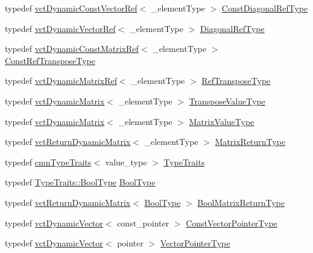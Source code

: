 \begin{DoxyCompactItemize}
\item 
typedef \hyperlink{classvct_dynamic_const_vector_ref}{vct\+Dynamic\+Const\+Vector\+Ref}$<$ \+\_\+element\+Type $>$ \hyperlink{classvct_dynamic_const_matrix_base_aa497314340719c9e70a4991d3f306d7e}{Const\+Diagonal\+Ref\+Type}
\item 
typedef \hyperlink{classvct_dynamic_vector_ref}{vct\+Dynamic\+Vector\+Ref}$<$ \+\_\+element\+Type $>$ \hyperlink{classvct_dynamic_const_matrix_base_a2773e894d2ce8aa7a479eeecc535ac33}{Diagonal\+Ref\+Type}
\item 
typedef \hyperlink{classvct_dynamic_const_matrix_ref}{vct\+Dynamic\+Const\+Matrix\+Ref}$<$ \+\_\+element\+Type $>$ \hyperlink{classvct_dynamic_const_matrix_base_a2ee053ef5a591f470076e2a0c215fa44}{Const\+Ref\+Transpose\+Type}
\item 
typedef \hyperlink{classvct_dynamic_matrix_ref}{vct\+Dynamic\+Matrix\+Ref}$<$ \+\_\+element\+Type $>$ \hyperlink{classvct_dynamic_const_matrix_base_afff0f3bee56a8562e0ec772b35e24475}{Ref\+Transpose\+Type}
\item 
typedef \hyperlink{classvct_dynamic_matrix}{vct\+Dynamic\+Matrix}$<$ \+\_\+element\+Type $>$ \hyperlink{classvct_dynamic_const_matrix_base_aae6fde8d869581c6de1f1cbe7f17c588}{Transpose\+Value\+Type}
\item 
typedef \hyperlink{classvct_dynamic_matrix}{vct\+Dynamic\+Matrix}$<$ \+\_\+element\+Type $>$ \hyperlink{classvct_dynamic_const_matrix_base_ad7a2deb73c9de7bbea753cee80fb2ada}{Matrix\+Value\+Type}
\item 
typedef \hyperlink{classvct_return_dynamic_matrix}{vct\+Return\+Dynamic\+Matrix}$<$ \+\_\+element\+Type $>$ \hyperlink{classvct_dynamic_const_matrix_base_aed2ac5b2cf673fab97a67418f8e69646}{Matrix\+Return\+Type}
\item 
typedef \hyperlink{classcmn_type_traits}{cmn\+Type\+Traits}$<$ value\+\_\+type $>$ \hyperlink{classvct_dynamic_const_matrix_base_a42f1e63cd9923069111d907ec98ac6ee}{Type\+Traits}
\item 
typedef \hyperlink{classcmn_type_traits_aaa41087228a7f165bcd9f4385e644e28}{Type\+Traits\+::\+Bool\+Type} \hyperlink{classvct_dynamic_const_matrix_base_acc160095f46a6928d71f3eb7d33a1b12}{Bool\+Type}
\item 
typedef \hyperlink{classvct_return_dynamic_matrix}{vct\+Return\+Dynamic\+Matrix}$<$ \hyperlink{classvct_dynamic_const_matrix_base_acc160095f46a6928d71f3eb7d33a1b12}{Bool\+Type} $>$ \hyperlink{classvct_dynamic_const_matrix_base_ac71d88dda7abaaeb2276b83f2e49def7}{Bool\+Matrix\+Return\+Type}
\item 
typedef \hyperlink{classvct_dynamic_vector}{vct\+Dynamic\+Vector}$<$ const\+\_\+pointer $>$ \hyperlink{classvct_dynamic_const_matrix_base_ae4eb1369d9d05fdf98786c5583834e73}{Const\+Vector\+Pointer\+Type}
\item 
typedef \hyperlink{classvct_dynamic_vector}{vct\+Dynamic\+Vector}$<$ pointer $>$ \hyperlink{classvct_dynamic_const_matrix_base_aa3fdaf7217ea2667db03af719c3371c4}{Vector\+Pointer\+Type}
\end{DoxyCompactItemize}
